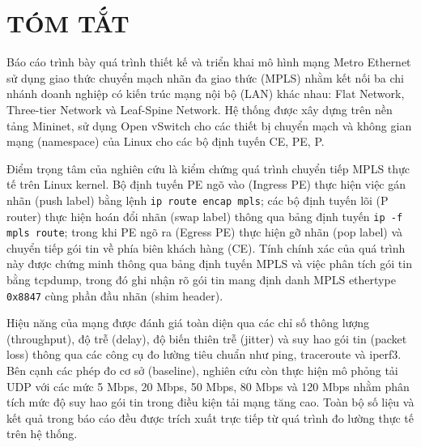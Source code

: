 \section*{TÓM TẮT}
 {}

Báo cáo trình bày quá trình thiết kế và triển khai mô hình mạng Metro Ethernet sử dụng giao thức chuyển mạch nhãn đa giao thức (MPLS) nhằm kết nối ba chi nhánh doanh nghiệp có kiến trúc mạng nội bộ (LAN) khác nhau: Flat Network, Three-tier Network và Leaf-Spine Network. Hệ thống được xây dựng trên nền tảng Mininet, sử dụng Open vSwitch cho các thiết bị chuyển mạch và không gian mạng (namespace) của Linux cho các bộ định tuyến CE, PE, P.

Điểm trọng tâm của nghiên cứu là kiểm chứng quá trình chuyển tiếp MPLS thực tế trên Linux kernel. Bộ định tuyến PE ngõ vào (Ingress PE) thực hiện việc gán nhãn (push label) bằng lệnh \texttt{ip route encap mpls}; các bộ định tuyến lõi (P router) thực hiện hoán đổi nhãn (swap label) thông qua bảng định tuyến \texttt{ip -f mpls route}; trong khi PE ngõ ra (Egress PE) thực hiện gỡ nhãn (pop label) và chuyển tiếp gói tin về phía biên khách hàng (CE). Tính chính xác của quá trình này được chứng minh thông qua bảng định tuyến MPLS và việc phân tích gói tin bằng tcpdump, trong đó ghi nhận rõ gói tin mang định danh MPLS ethertype \texttt{0x8847} cùng phần đầu nhãn (shim header).

Hiệu năng của mạng được đánh giá toàn diện qua các chỉ số thông lượng (throughput), độ trễ (delay), độ biến thiên trễ (jitter) và suy hao gói tin (packet loss) thông qua các công cụ đo lường tiêu chuẩn như ping, traceroute và iperf3. Bên cạnh các phép đo cơ sở (baseline), nghiên cứu còn thực hiện mô phỏng tải UDP với các mức 5 Mbps, 20 Mbps, 50 Mbps, 80 Mbps và 120 Mbps nhằm phân tích mức độ suy hao gói tin trong điều kiện tải mạng tăng cao. Toàn bộ số liệu và kết quả trong báo cáo đều được trích xuất trực tiếp từ quá trình đo lường thực tế trên hệ thống.

\newpage
